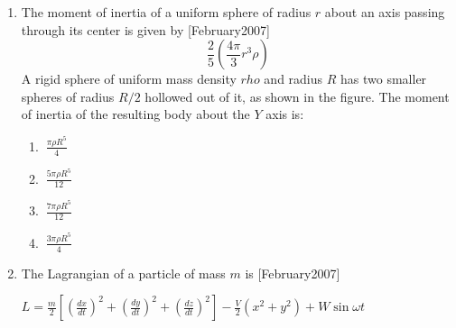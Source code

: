 \documentclass[journal]{IEEEtran}
\begin{document}
\begin{enumerate}
\item The moment of inertia of a uniform sphere of radius  $r$ about an axis passing through its center is given by \hfill[February2007]
\[
\frac{2}{5} \left( \frac{4\pi}{3} r^3 \rho \right)
\]
A rigid sphere of uniform mass density $rho$ and radius  $R$ has two smaller spheres of radius $ R/2$  hollowed out of it, as shown in the figure. The moment of inertia of the resulting body about the $Y$ axis is:
\begin{center}
\end{center}
\begin{enumerate}
\item $ \ \frac{\pi \rho R^5}{4}
\quad $
\item $ \ \frac{5\pi \rho R^5}{12}
\quad $
\item $ \ \frac{7\pi \rho R^5}{12}
\quad $
\item $ \ \frac{3\pi \rho R^5}{4}
$
\end{enumerate}
\newpage
\item The Lagrangian of a particle of mass  $m$  is \hfill[February2007]

$L = \frac{m}{2} \left[ \left( \frac{dx}{dt} \right)^2 + \left( \frac{dy}{dt} \right)^2 + \left( \frac{dz}{dt} \right)^2 \right] - \frac{V}{2} \left( x^2 + y^2 \right) + W \sin \omega t $


\end{enumerate}
\end{document}
